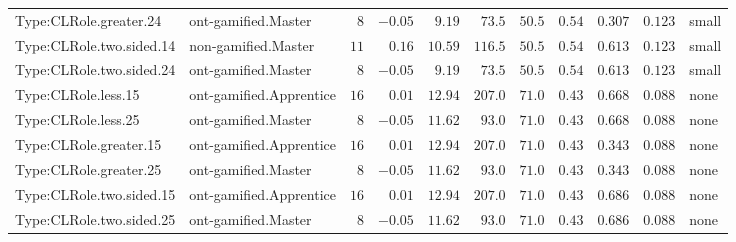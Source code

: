 \documentclass[6pt,a4paper]{article}
\begin{document}
{\begin{longtable}{llrrrrrrrrl}
Type:CLRole.greater.24&ont-gamified.Master&$ 8$&$-0.05$&$ 9.19$&$ 73.5$&$ 50.5$&$ 0.54$&$0.307$&$0.123$&small\tabularnewline
Type:CLRole.two.sided.14&non-gamified.Master&$11$&$ 0.16$&$10.59$&$116.5$&$ 50.5$&$ 0.54$&$0.613$&$0.123$&small\tabularnewline
Type:CLRole.two.sided.24&ont-gamified.Master&$ 8$&$-0.05$&$ 9.19$&$ 73.5$&$ 50.5$&$ 0.54$&$0.613$&$0.123$&small\tabularnewline
Type:CLRole.less.15&ont-gamified.Apprentice&$16$&$ 0.01$&$12.94$&$207.0$&$ 71.0$&$ 0.43$&$0.668$&$0.088$&none\tabularnewline
Type:CLRole.less.25&ont-gamified.Master&$ 8$&$-0.05$&$11.62$&$ 93.0$&$ 71.0$&$ 0.43$&$0.668$&$0.088$&none\tabularnewline
Type:CLRole.greater.15&ont-gamified.Apprentice&$16$&$ 0.01$&$12.94$&$207.0$&$ 71.0$&$ 0.43$&$0.343$&$0.088$&none\tabularnewline
Type:CLRole.greater.25&ont-gamified.Master&$ 8$&$-0.05$&$11.62$&$ 93.0$&$ 71.0$&$ 0.43$&$0.343$&$0.088$&none\tabularnewline
\newpage
Type:CLRole.two.sided.15&ont-gamified.Apprentice&$16$&$ 0.01$&$12.94$&$207.0$&$ 71.0$&$ 0.43$&$0.686$&$0.088$&none\tabularnewline
Type:CLRole.two.sided.25&ont-gamified.Master&$ 8$&$-0.05$&$11.62$&$ 93.0$&$ 71.0$&$ 0.43$&$0.686$&$0.088$&none\tabularnewline
\hline
\end{longtable}}
\end{document}

